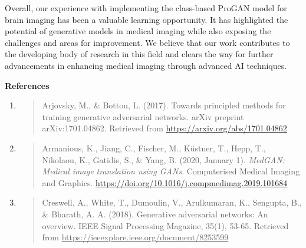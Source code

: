 \documentclass[
]{article}
\begin{document}
Overall, our experience with implementing the class-based ProGAN model
for brain imaging has been a valuable learning opportunity. It has
highlighted the potential of generative models in medical imaging while
also exposing the challenges and areas for improvement. We believe that
our work contributes to the developing body of research in this field
and clears the way for further advancements in enhancing medical imaging
through advanced AI techniques.
\pagebreak

 \begin{center}
\textbf{References\\
}
\end{center}

\begin{enumerate}
\def\labelenumi{\arabic{enumi})}
\item
  \begin{quote}
  Arjovsky, M., \& Bottou, L. (2017). Towards principled methods for
  training generative adversarial networks. arXiv preprint
  arXiv:1701.04862. Retrieved from
  \href{https://arxiv.org/abs/1701.04862}{\uline{https://arxiv.org/abs/1701.04862}}
  \end{quote}
\item
  \begin{quote}
  Armanious, K., Jiang, C., Fischer, M., Küstner, T., Hepp, T.,
  Nikolaou, K., Gatidis, S., \& Yang, B. (2020, January 1).
  \emph{MedGAN: Medical image translation using GANs}. Computerised
  Medical Imaging and Graphics.
  \href{https://doi.org/10.1016/j.compmedimag.2019.101684}{\uline{https://doi.org/10.1016/j.compmedimag.2019.101684}}
  \end{quote}
\item
  \begin{quote}
  Creswell, A., White, T., Dumoulin, V., Arulkumaran, K., Sengupta, B.,
  \& Bharath, A. A. (2018). Generative adversarial networks: An
  overview. IEEE Signal Processing Magazine, 35(1), 53-65. Retrieved
  from \uline{https://ieeexplore.ieee.org/document/8253599}
  \end{quote}



\end{enumerate}
\end{document}
